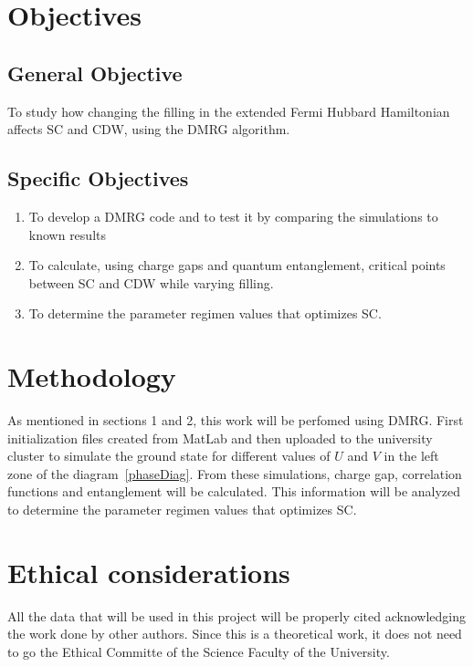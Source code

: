 \documentclass{article}
\begin{document}
\section{Objectives}
\subsection{General Objective}

To study how changing the filling in the extended Fermi Hubbard Hamiltonian affects SC and CDW, using the DMRG algorithm. 

\subsection{Specific Objectives}

\begin{enumerate}
    \item To develop a DMRG code and to test it by comparing the simulations to known results
    \item  To calculate, using charge gaps and quantum entanglement, critical points between SC and CDW while varying filling.
    \item To determine the parameter regimen values that optimizes SC.
\end{enumerate}

\section{Methodology}

As mentioned in sections 1 and 2, this work will be perfomed using DMRG. First initialization files created from MatLab and then uploaded to the university cluster to simulate the ground state for different values of $U$ and $V$ in the left zone of the diagram~\ref{phaseDiag}. From these simulations, charge gap, correlation functions and entanglement will be calculated. This information will be analyzed to determine the parameter regimen values that optimizes SC.

\section{Ethical considerations}

All the data that will be used in this project will be properly cited acknowledging the work done by other authors. Since this is a theoretical work, it does not need to go the Ethical Committe of the Science Faculty of the University.
\end{document}
